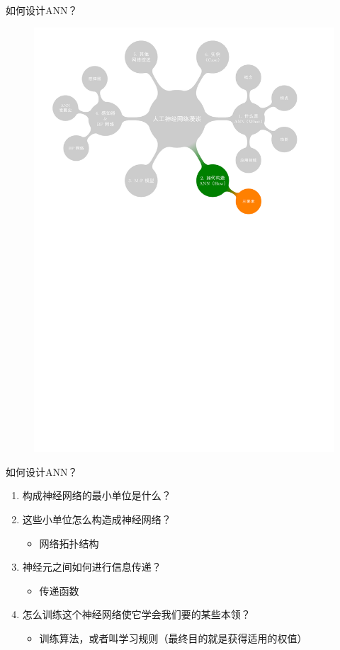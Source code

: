 \documentclass[xcolor=svgnames]{beamer}
\begin{document}
\begin{frame}{如何设计ANN？}
  \vspace{-1em}
  \begin{figure}
    \centering
    \includegraphics[width=\textwidth]{mindmap/map3.pdf}
  \end{figure}
\end{frame}

\begin{frame}{如何设计ANN？}
  \begin{enumerate}
  \item 构成神经网络的\alert{最小单位}是什么？
  \item 这些小单位\alert{怎么构造}成神经网络？
    \begin{itemize}
    \item 网络拓扑结构
    \end{itemize}
  \item 神经元之间如何进行\alert{信息传递}？
    \begin{itemize}
    \item 传递函数
    \end{itemize}
  \item 怎么\alert{训练}这个神经网络使它学会我们要的某些本领？
    \begin{itemize}
    \item 训练算法，或者叫学习规则（最终目的就是获得适用的权值）
    \end{itemize}
  \end{enumerate}
\end{frame}
\end{document}
